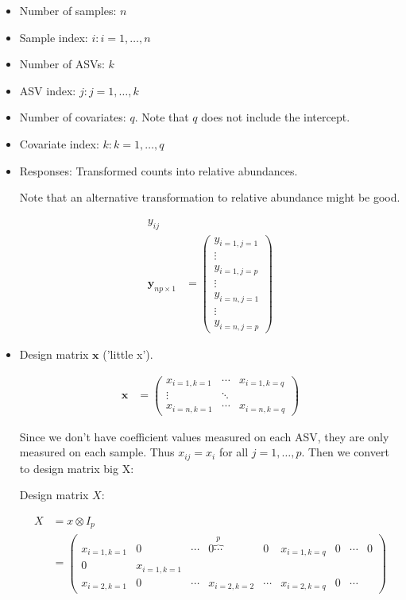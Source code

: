 \documentclass[10pt]{article}
\theoremstyle{definition}
\begin{document}
\begin{itemize}
  \item Number of samples: $n$
  \item Sample index: $i: i = 1, \ldots, n$
  \item Number of ASVs: $k$
  \item ASV index: $j: j = 1, \ldots , k$
  \item Number of covariates: $q$. Note that $q$ does not include the intercept.
  \item Covariate index: $k: k = 1, \ldots , q$

  \item Responses: Transformed counts into relative abundances.

  Note that an alternative transformation to relative abundance might be good. %

   \begin{align*}
     y_{ij}\\
     \textbf{y}_{np \times 1} &= \begin{pmatrix} y_{i = 1, j = 1} \\\vdots \\ y_{i = 1, j = p}\\ \vdots \\ y_{i = n, j = 1} \\ \vdots  \\y_{i = n, j = p}\end{pmatrix}
   \end{align*}

   \item

   Design matrix $\mathbf{x}$ ('little x').

\begin{align*}
  \mathbf{x} &= \begin{pmatrix}x_{i=1, k = 1} & \cdots & x_{i = 1, k = q}\\
\vdots & \ddots & \\
x_{i = n, k = 1} & \cdots & x_{i = n, k = q}\end{pmatrix}
\end{align*}


    Since we don't have coefficient values measured on each ASV, they are only measured on each sample. Thus $x_{ij} = x_{i}$ for all $j = 1, \ldots , p$. Then we convert to design matrix big X:

   Design matrix $X$:

   \begin{align*}
     X &= x \otimes I_p\\
     &= \begin{pmatrix} x_{i = 1, k = 1} & 0 & \cdots & 0 \overbrace{\cdots}^p & 0  & x_{i = 1, k = q} & 0 & \cdots & 0 \\ 0 & x_{i = 1, k = 1} \\ x_{i = 2, k = 1} & 0 & \cdots & x_{i = 2, k = 2} & \cdots & x_{i = 2, k = q} & 0 & \cdots \end{pmatrix}
   \end{align*}



\end{itemize}
\end{document}

